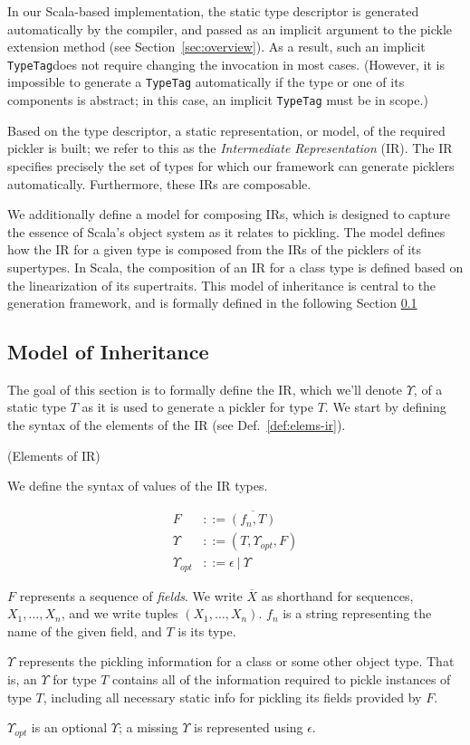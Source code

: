 \documentclass[preprint,10pt]{sigplanconf}
\theoremstyle{definition}
\theoremstyle{definition}
\newcommand{\term}[1]{\mbox{\texttt{#1}}}
\begin{document}
In our Scala-based implementation, the static type descriptor is generated
automatically by the compiler, and passed as an implicit argument to the
pickle extension method (see Section~\ref{sec:overview}). As a result, such an
implicit \term{TypeTag}\footnotemark[2] does not require changing the invocation in most cases.
(However, it is impossible to generate a \term{TypeTag} automatically if the
type or one of its components is abstract; in this case, an implicit
\term{TypeTag} must be in scope.)

Based on the type descriptor, a static representation, or model, of the
required pickler is built; we refer to this as the {\em Intermediate
Representation} (IR). The IR specifies precisely the set of types for which
our framework can generate picklers automatically. Furthermore, these IRs are composable.

We additionally define a model for composing IRs, which is designed to capture
the essence of Scala's object system as it relates to pickling. The model
defines how the IR for a given type is composed from the IRs of the picklers
of its supertypes. In Scala, the composition of an IR for a class type is
defined based on the linearization of its supertraits. \footnotemark[3]
This model of inheritance is central to the generation framework, and is
formally defined in the following Section \ref{sec:ir}

\subsection{Model of Inheritance}
\label{sec:ir}

The goal of this section is to formally define the IR, which we'll denote
$\Upsilon$, of a static type $T$ as it is used to generate a pickler for
type $T$. We start by defining the syntax of the elements of the IR
(see Def.~\ref{def:elems-ir}).

\begin{defn}{(Elements of IR)}
\label{def:elems-ir}

We define the syntax of values of the IR types.

\begin{align*}
F&        ::= \overline{(f_n, T)}\\
\Upsilon&       ::= (T, \Upsilon_{opt}, F)\\
\Upsilon_{opt}& ::= \epsilon~|~\Upsilon
\end{align*}

$F$ represents a sequence of \textit{fields}. We write $\overline{X}$ as
shorthand for sequences, $X_1,\dots,X_n$, and we write tuples
$(X_1,\dots,X_n)$. $f_n$ is a string representing the name of the given field,
and $T$ is its type.

$\Upsilon$ represents the pickling information for a class or some other object
type. That is, an $\Upsilon$ for type $T$ contains all of the information required
to pickle instances of type $T$, including all necessary static info for
pickling its fields provided by $F$.

$\Upsilon_{opt}$ is an optional $\Upsilon$; a missing $\Upsilon$ is represented using $\epsilon$.
\end{defn}
\end{document}
